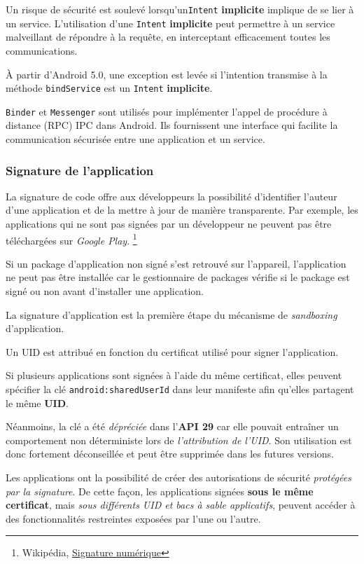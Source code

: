 \documentclass[
  french,
  paper=a4,
  ,captions=tableheading
]{scrartcl}
\begin{document}
Un risque de sécurité est soulevé lorsqu'un\texttt{Intent}
\textbf{implicite} implique de se lier à un service. L'utilisation d'une
\texttt{Intent} \textbf{implicite} peut permettre à un service
malveillant de répondre à la requête, en interceptant efficacement
toutes les communications.

À partir d'Android 5.0, une exception est levée si l'intention transmise
à la méthode \texttt{bindService} est un \texttt{Intent}
\textbf{implicite}.

\texttt{Binder} et \texttt{Messenger} sont utilisés pour implémenter
l'appel de procédure à distance (RPC) IPC dans Android. Ils fournissent
une interface qui facilite la communication sécurisée entre une
application et un service.

\hypertarget{signature-de-lapplication}{%
\subsubsection{Signature de
l'application}\label{signature-de-lapplication}}

La signature de code offre aux développeurs la possibilité d'identifier
l'auteur d'une application et de la mettre à jour de manière
transparente. Par exemple, les applications qui ne sont pas signées par
un développeur ne peuvent pas être téléchargées sur \emph{Google Play}.
\footnote{Wikipédia,
  \href{https://fr.wikipedia.org/wiki/Signature_numérique}{Signature
  numérique}}

Si un package d'application non signé s'est retrouvé sur l'appareil,
l'application ne peut pas être installée car le gestionnaire de packages
vérifie si le package est signé ou non avant d'installer une
application.

La signature d'application est la première étape du mécanisme de
\emph{sandboxing} d'application.

Un UID est attribué en fonction du certificat utilisé pour signer
l'application.

Si plusieurs applications sont signées à l'aide du même certificat,
elles peuvent spécifier la clé \texttt{android:sharedUserId} dans leur
manifeste afin qu'elles partagent le même \textbf{UID}.

Néanmoins, la clé a été \emph{dépréciée} dans l'\textbf{API 29} car elle
pouvait entraîner un comportement non déterministe lors de
\emph{l'attribution de l'UID}. Son utilisation est donc fortement
déconseillée et peut être supprimée dans les futures versions.

Les applications ont la possibilité de créer des autorisations de
sécurité \emph{protégées par la signature}. De cette façon, les
applications signées \textbf{sous le même certificat}, mais \emph{sous
différents UID et bacs à sable applicatifs}, peuvent accéder à des
fonctionnalités restreintes exposées par l'une ou l'autre.
\end{document}
